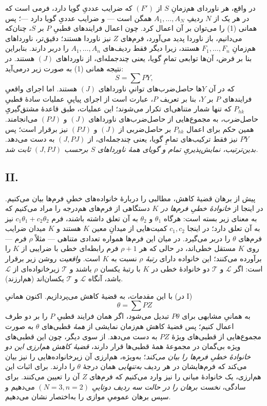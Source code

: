 \documentclass[11pt]{article}
\begin{document}
در واقع، هر ناوردای هم‌زمانِ $S$ از $(F')$ که ضرایب عددیِ گویا دارد، فرمی است که در هر یک از $N$ ردیفِ $A_1,\ldots,A_N$ همگن است --- و ضرایب عددیِ گویا دارد ---؛ پس همانی (1) را می‌توان بر آن اعمال کرد. چون اعمال فرایندهای قطبیِ $P$ بر $S$، چنان‌که می‌دانیم، باز ناوردا پدید می‌آورد، فرم‌های $Z$ نیز ناوردا هستند؛ دقیق‌تر، ناورداهای هم‌زمانِ $F_1,
\ldots,F_n$ هستند، زیرا دیگر فقط ردیف‌های $A_1,
\ldots,A_n$ را دربر دارند. بنابراین بنا بر فرض، آن‌ها توابعی تمامِ گویا، یعنی چندجمله‌ای، از ناورداهای $(J)$ هستند. در نتیجه همانی (1) به صورت زیر درمی‌آید:
\[
  S=\sum PY,
\]
که در آن $Y$ها حاصل‌ضرب‌های توانیِ ناورداهای $(J)$ هستند. اما اجرای واقعیِ فرایندهای $P$ بر $Y$، بنا بر تعریف $P$، عبارت است از اجرای پیاپیِ عملیات سادهٔ قطبیِ $P_{hk}$ که تنها شمار متناهی‌ای تکرار می‌شوند؛ این عملیات، طبق قاعدهٔ مشتق‌گیریِ حاصل‌ضرب، به مجموع‌هایی از حاصل‌ضرب‌های ناورداهای $(J)$ و $(PJ)$ می‌انجامند. همین حکم برای اعمال $P_{hk}$ بر حاصل‌ضربی از $(J)$ و $(PJ)$ نیز برقرار است؛ پس $PY$ نیز فقط ترکیب‌های تمامِ گویا، یعنی چندجمله‌ای، از $(J,PJ)$ به دست می‌دهد. \emph{بدین‌ترتیب، نمایش‌پذیریِ تمام و گویای همهٔ ناورداهای $S$ برحسب $(J,PJ)$ ثابت شد.}

\subsection*{II.}
پیش از برهان قضیهٔ کاهش، مطالبی را دربارهٔ خانواده‌های خطیِ فرم‌ها بیان می‌کنیم. در اینجا از \emph{خانوادهٔ خطیِ فرم‌ها در $K$} دستگاهی از فرم‌های هم‌درجه را مراد می‌کنیم که به معنای زیر بسته است: هرگاه $\theta_1$ و $\theta_2$ به آن تعلق داشته باشند، فرم $c_1\theta_1+c_2\theta_2$ نیز به آن تعلق دارد؛ در اینجا $c_1,c_2$ کمیت‌هایی از میدانِ معین $K$ هستند و $K$ میدان ضرایب فرم‌های $\theta$ را دربر می‌گیرد. در میان این فرم‌ها همواره تعدادی متناهی --- مثلاً $\rho$ فرم --- روی $K$ مستقل خطی‌اند، در حالی که هر $\rho+1$ فرم رابطه‌ای خطی با ضرایبی از $K$ را برآورده می‌کنند؛ این خانواده دارای \emph{رتبهٔ $\rho$} نسبت به $K$ است. \emph{واقعیت} روشن زیر برقرار است: اگر $\mathcal L$ و $\mathcal T$ دو خانوادهٔ خطی در $K$ با رتبهٔ یکسان $\rho$ باشند و $\mathcal T$ زیرخانواده‌ای از $\mathcal L$ باشد، آنگاه $\mathcal L$ و $\mathcal T$ یکسان‌اند (هم‌ارزند).

با این مقدمات، به قضیهٔ کاهش می‌پردازیم. اکنون همانیِ (در I)
\[
  \theta=\sum PZ
\]
به همانیِ مشابهی برای $P\theta$ تبدیل می‌شود، اگر همان فرایند قطبیِ $P$ را بر دو طرف اعمال کنیم؛ پس قضیهٔ کاهش هم‌زمان نمایشی از \emph{همهٔ} قطبی‌های $\theta$ به صورت مجموع‌هایی از قطبی‌های ویژهٔ $PZ$ به دست می‌دهد. از سوی دیگر، چون این قطبی‌های ویژه بی‌گمان در مجموعهٔ همهٔ قطبی‌ها قرار دارند، \emph{قضیهٔ کاهش هم‌ارزی این دو خانوادهٔ خطیِ فرم‌ها را بیان می‌کند}؛ به‌ویژه، هم‌ارزی آن زیرخانواده‌هایی را نیز بیان می‌کند که فرم‌هایشان در هر ردیف \emph{به‌تنهایی} همان درجهٔ $\theta$ را دارند. برای اثبات این هم‌ارزی، یک خانوادهٔ میانی را نیز وارد می‌کنیم که فرم‌های $Z$ آن را تعیین می‌کنند. برای سادگی، \emph{نخست برهان را در حالت سه ردیف دوتاییِ $(N=3,n=2)$} می‌دهیم و سپس برهان عمومیِ موازی را به‌اختصار نشان می‌دهیم.
\end{document}
